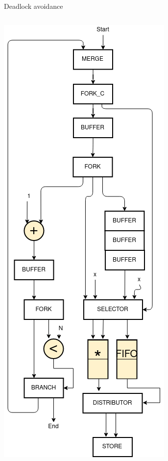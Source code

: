\documentclass{beamer}
\begin{document}
\begin{frame}{Deadlock avoidance}
\begin{columns}[T]
    \begin{column}{0.25\textwidth}
        \begin{center}
      \includegraphics[scale=0.21]{deadlock_1.png}
    \end{center}
    \end{column}
  \end{columns}
\end{frame}

\newcommand{\deadlockAnimation}[1]{
\begin{frame}{Deadlock avoidance}
\begin{center}
\texttt{[image: \#1]}
\end{center}
\end{frame}
}
\end{document}
